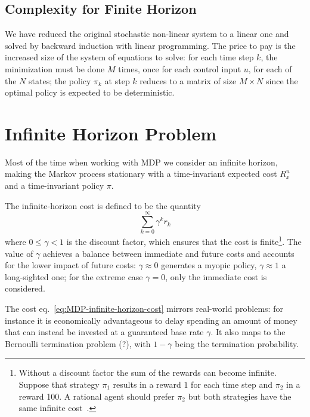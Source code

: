 \subsection{Complexity for Finite Horizon}
\label{sec:MDP-complexity-finite-horizon}

We have reduced the original stochastic non-linear system to a linear one and solved by backward induction with linear programming. The price to pay is the increased size of the system of equations to solve: for each time step $k$, the minimization must be done $M$ times, once for each control input $u$, for each of the $N$ states; the policy $\pi_k$ at step $k$ reduces to a matrix of size $M\times N$ since the optimal policy is expected to be deterministic.


\section{Infinite Horizon Problem}
\label{sec:MDP-infinite-horizon}

Most of the time when working with MDP we consider an infinite horizon, making the Markov process stationary with a time-invariant expected cost $R_x^u$ and a time-invariant policy $\pi$.

The infinite-horizon cost is defined to be the quantity
\begin{equation}
  \label{eq:MDP-infinite-horizon-cost}
  \sum_{k=0}^\infty \gamma^k r_k
\end{equation}
where $0 \le \gamma < 1$ is the discount factor, which ensures that the cost is finite\footnote{Without a discount factor the sum of the rewards can become infinite. Suppose that strategy $\pi_1$ results in a reward $1$ for each time step and $\pi_2$ in a reward 100. A rational agent should prefer $\pi_2$ but both strategies have the same infinite cost~\cite{decision-making-kochenderfer}.}. The value of $\gamma$ achieves a balance between immediate and future costs and accounts for the lower impact of future costs: $\gamma \approx 0$ generates a myopic policy, $\gamma \approx 1$ a long-sighted one; for the extreme case $\gamma = 0$, only the immediate cost is considered.

The cost eq.~\eqref{eq:MDP-infinite-horizon-cost} mirrors real-world problems: for instance it is economically advantageous to delay spending an amount of money that can instead be invested at a guaranteed base rate $\gamma$. It also maps to the Bernoulli termination problem (?), with $1-\gamma$ being the termination probability.

